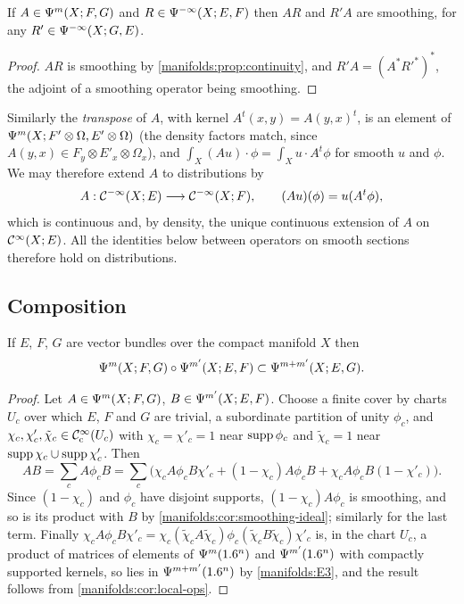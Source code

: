 \begin{corollary}\label{manifolds:cor:smoothing-ideal}
If $A\in\Psi^{m}(X;F,G)$ and $R\in\Psi^{-\infty}(X;E,F)$ then $AR$ and $R'A$ are
smoothing, for any $R'\in\Psi^{-\infty}(X;G,E)$.
\end{corollary}
\begin{proof}
$AR$ is smoothing by \cref{manifolds:prop:continuity}, and $R'A=(A^*R'^*)^*$, the
adjoint of a smoothing operator being smoothing.
\end{proof}

Similarly the \emph{transpose} of $A$, with kernel $A^t(x,y)=A(y,x)^t$, is an
element of $\Psi^{m}(X;F'\otimes\Omega,E'\otimes\Omega)$ (the density factors
match, since $A(y,x)\in F_y\otimes E'_x\otimes\Omega_x$), and
$\int_X(Au)\cdot\phi=\int_Xu\cdot A^t\phi$ for smooth $u$ and $\phi$. We may therefore
extend $A$ to distributions by
\begin{equation}\label{manifolds:eq:distributions-action}
A:\mathcal{C}^{-\infty}(X;E)\longrightarrow\mathcal{C}^{-\infty}(X;F),\qquad (Au)(\phi)=u(A^t\phi),
\end{equation}
which is continuous and, by density, the unique continuous extension of $A$ on
$\mathcal{C}^\infty(X;E)$. All the identities below between operators on smooth sections
therefore hold on distributions.

\subsection{Composition}
\begin{theorem}\label{manifolds:thm:composition}
If $E$, $F$, $G$ are vector bundles over the compact manifold $X$ then
\begin{equation*}
\Psi^{m}(X;F,G)\circ\Psi^{m'}(X;E,F)\subset\Psi^{m+m'}(X;E,G).
\end{equation*}
\end{theorem}
\begin{proof}
Let $A\in\Psi^{m}(X;F,G)$, $B\in\Psi^{m'}(X;E,F)$. Choose a finite cover by charts
$U_c$ over which $E$, $F$ and $G$ are trivial, a subordinate partition of unity
$\phi_c$, and $\chi_c,\chi'_c,\tilde\chi_c\in\mathcal{C}^\infty_{\mathrm{c}}(U_c)$ with $\chi_c=\chi'_c=1$ near
$\operatorname{supp}\phi_c$ and $\tilde\chi_c=1$ near $\operatorname{supp}\chi_c\cup\operatorname{supp}\chi'_c$. Then
\begin{equation*}
AB=\sum_cA\phi_cB=\sum_c\big(\chi_cA\phi_cB\chi'_c+(1-\chi_c)A\phi_cB+\chi_cA\phi_cB(1-\chi'_c)\big).
\end{equation*}
Since $(1-\chi_c)$ and $\phi_c$ have disjoint supports, $(1-\chi_c)A\phi_c$ is smoothing,
and so is its product with $B$ by \cref{manifolds:cor:smoothing-ideal}; similarly for
the last term. Finally
$\chi_cA\phi_cB\chi'_c=\chi_c(\tilde\chi_cA\tilde\chi_c)\phi_c(\tilde\chi_cB\tilde\chi_c)\chi'_c$
is, in the chart $U_c$, a product of matrices of elements of $\Psi^{m}(1.6^n)$ and
$\Psi^{m'}(1.6^n)$ with compactly supported kernels, so lies in
$\Psi^{m+m'}(1.6^n)$ by \ref{manifolds:E3}, and the result follows from
\cref{manifolds:cor:local-ops}.
\end{proof}

